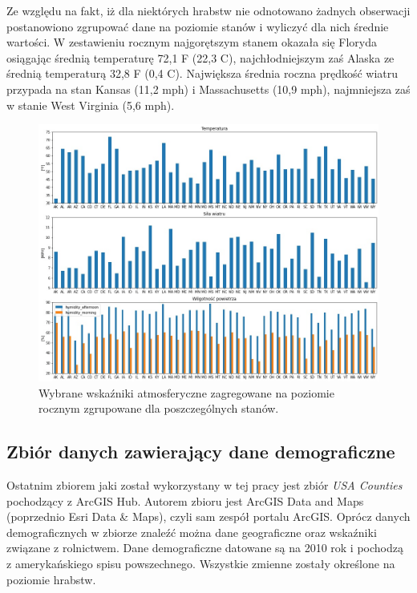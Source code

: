 \documentclass[polish, twoside, 12pt, a4paper]{article}
\theoremstyle{definition}
\theoremstyle{plain}
\theoremstyle{remark}
\begin{document}
Ze względu na fakt, iż dla niektórych hrabstw nie odnotowano żadnych obserwacji postanowiono zgrupować dane na poziomie stanów i wyliczyć dla nich średnie wartości. W zestawieniu rocznym najgorętszym stanem okazała się Floryda osiągając średnią temperaturę 72,1 \textdegree F (22,3 \textdegree C), najchłodniejszym zaś Alaska ze średnią temperaturą 32,8 \textdegree F (0,4 \textdegree C). Największa średnia roczna prędkość wiatru przypada na stan Kansas (11,2 mph) i Massachusetts (10,9 mph), najmniejsza zaś w stanie West Virginia (5,6 mph). 

\begin{figure}[H]
\centering
\includegraphics[width=15cm]{atm-all.jpg}
\caption{Wybrane wskaźniki atmosferyczne zagregowane na poziomie rocznym zgrupowane dla poszczególnych stanów. }
\end{figure}


\subsection{Zbiór danych zawierający dane demograficzne}

Ostatnim zbiorem jaki został wykorzystany w tej pracy jest zbiór \emph{USA Counties} pochodzący z ArcGIS Hub. Autorem zbioru jest ArcGIS Data and Maps (poprzednio Esri Data \& Maps), czyli sam zespół portalu ArcGIS. Oprócz danych demograficznych w zbiorze znaleźć można dane geograficzne oraz wskaźniki związane z rolnictwem. Dane demograficzne datowane są na 2010 rok i pochodzą z amerykańskiego spisu powszechnego. Wszystkie zmienne zostały określone na poziomie hrabstw.
\end{document}
